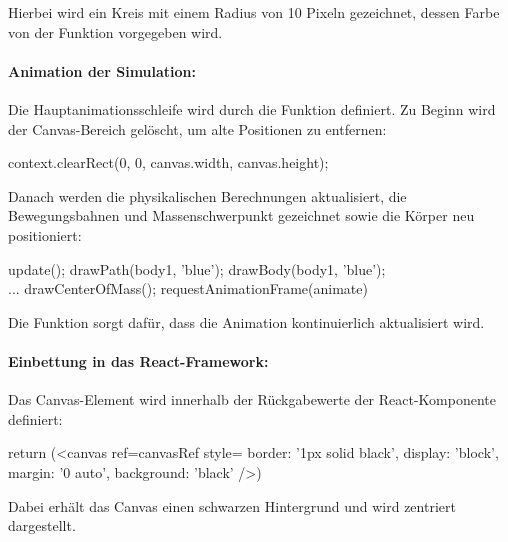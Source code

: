 \documentclass[a4paper,12pt,twoside]{article}
\begin{document}
Hierbei wird ein Kreis mit einem Radius von 10 Pixeln gezeichnet, dessen Farbe von der Funktion vorgegeben wird.

\paragraph{Animation der Simulation:}
Die Hauptanimationsschleife wird durch die Funktion  definiert. Zu Beginn wird der Canvas-Bereich gelöscht, um alte Positionen zu entfernen:

\begin{javascript}
context.clearRect(0, 0, canvas.width, canvas.height);
\end{javascript}

Danach werden die physikalischen Berechnungen aktualisiert, die Bewegungsbahnen und Massenschwerpunkt gezeichnet sowie die Körper neu positioniert:

\begin{javascript}
update();
drawPath(body1, 'blue');
drawBody(body1, 'blue');
\\...
drawCenterOfMass();
requestAnimationFrame(animate)
\end{javascript}

Die Funktion  sorgt dafür, dass die Animation kontinuierlich aktualisiert wird.

\paragraph{Einbettung in das React-Framework:}
Das Canvas-Element wird innerhalb der Rückgabewerte der React-Komponente definiert:

\begin{javascript}
return (<canvas ref={canvasRef} style={{ border: '1px solid black', display: 'block', margin: '0 auto', background: 'black' }} />)
\end{javascript}
Dabei erhält das Canvas einen schwarzen Hintergrund und wird zentriert dargestellt.
\end{document}
